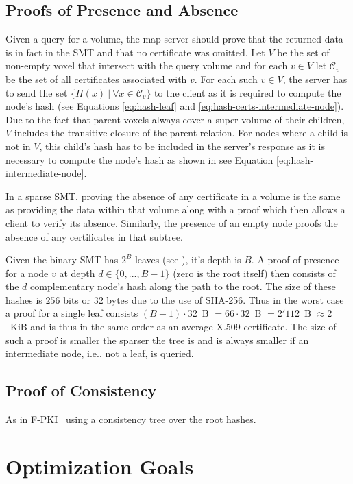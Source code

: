 \documentclass[10pt,conference,compsocconf]{IEEEtran}
\begin{document}
\subsection{Proofs of Presence and Absence}
\label{sec:data-structure:precense-absence}
Given a query for a volume, the map server should prove that the returned data is in fact in the SMT and that no certificate was omitted.
Let $V$ be the set of non-empty voxel that intersect with the query volume and for each $v \in V$ let $\mathcal{C}_v$ be the set of all certificates associated with $v$.
For each such $v \in V$, the server has to send the set $\{H(x) \: | \: \forall x \in \mathcal{C}_v \}$ to the client as it is required to compute the node's hash (see Equations \ref{eq:hash-leaf} and \ref{eq:hash-certs-intermediate-node}).
Due to the fact that parent voxels always cover a super-volume of their children, $V$ includes the transitive closure of the parent relation.
For nodes where a child is not in $V$, this child's hash has to be included in the server's response as it is necessary to compute the node's hash as shown in see Equation \ref{eq:hash-intermediate-node}.

In a sparse SMT, proving the absence of any certificate in a volume is the same as providing the data  within that volume along with a proof which then allows a client to verify its absence.
Similarly, the presence of an empty node proofs the absence of any certificates in that subtree.

Given the binary SMT has $2^{B}$ leaves (see ), it's depth is $B$.
A proof of presence for a node $v$ at depth $d \in \{0, ..., B-1\}$ (zero is the root itself) then consists of the $d$ complementary node's hash along the path to the root.
The size of these hashes is $256$ bits or $32$ bytes due to the use of SHA-256.
Thus in the worst case a proof for a single leaf consists $\left(B-1\right) \cdot 32$~B $= 66 \cdot 32$~B $= 2'112$~B $\approx 2$~KiB and is thus in the same order as an average X.509 certificate.
The size of such a proof is smaller the sparser the tree is and is always smaller if an intermediate node, i.e., not a leaf, is queried.

\subsection{Proof of Consistency}
\label{sec:data-structure:consistency}
As in F-PKI~\cite{chuat_f-pki_2022} using a consistency tree over the root hashes.

\section{Optimization Goals}
\label{sec:optimization-goals}
\end{document}
